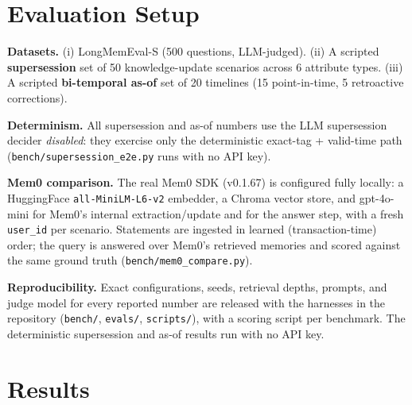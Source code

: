 \documentclass[11pt]{article}
\newcommand{\code}[1]{\texttt{#1}}
\begin{document}
\section{Evaluation Setup}

\textbf{Datasets.} (i) LongMemEval-S (500 questions, LLM-judged). (ii) A scripted
\textbf{supersession} set of 50 knowledge-update scenarios across 6 attribute types. (iii) A
scripted \textbf{bi-temporal as-of} set of 20 timelines (15 point-in-time, 5 retroactive corrections).

\textbf{Determinism.} All supersession and as-of numbers use the LLM supersession decider
\emph{disabled}: they exercise only the deterministic exact-tag + valid-time path
(\code{bench/supersession\_e2e.py} runs with no API key).

\textbf{Mem0 comparison.} The real Mem0 SDK (v0.1.67) is configured fully locally: a HuggingFace
\code{all-MiniLM-L6-v2} embedder, a Chroma vector store, and gpt-4o-mini for Mem0's internal
extraction/update and for the answer step, with a fresh \code{user\_id} per scenario. Statements
are ingested in learned (transaction-time) order; the query is answered over Mem0's retrieved
memories and scored against the same ground truth (\code{bench/mem0\_compare.py}).

\textbf{Reproducibility.} Exact configurations, seeds, retrieval depths, prompts, and judge model
for every reported number are released with the harnesses in the repository (\code{bench/},
\code{evals/}, \code{scripts/}), with a scoring script per benchmark. The deterministic
supersession and as-of results run with no API key.

\section{Results}\label{sec:results}
\end{document}
